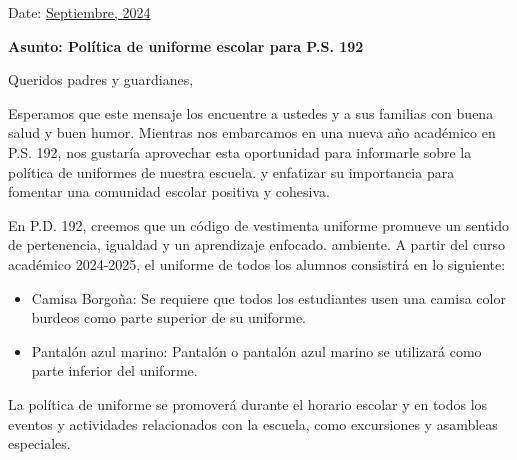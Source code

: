 \documentclass[12pt,letterpaper]{article}
\begin{document}
\vspace*{0.5in}
Date: \href{https://www.ps192.org/apps/bbmessages/show_bbm.jsp?REC_ID=139439}{Septiembre, 2024} 

\textbf{Asunto: Política de uniforme escolar para P.S. 192}

Queridos padres y guardianes,

Esperamos que este mensaje los encuentre a ustedes y a sus familias con buena salud y buen humor. Mientras nos embarcamos en una nueva
año académico en P.S. 192, nos gustaría aprovechar esta oportunidad para informarle sobre la política de uniformes de nuestra escuela.
y enfatizar su importancia para fomentar una comunidad escolar positiva y cohesiva.

En P.D. 192, creemos que un código de vestimenta uniforme promueve un sentido de pertenencia, igualdad y un aprendizaje enfocado.
ambiente. A partir del curso académico 2024-2025, el uniforme de todos los alumnos consistirá en lo siguiente:
\begin{itemize}
	\item Camisa Borgoña: Se requiere que todos los estudiantes usen una camisa color burdeos como parte superior de
su uniforme.
	\item Pantalón azul marino: Pantalón o pantalón azul marino se utilizará como parte inferior del uniforme.
\end{itemize}
La política de uniforme se promoverá durante el horario escolar y en todos los eventos y actividades relacionados con la escuela, como
excursiones y asambleas especiales.
\end{document}

